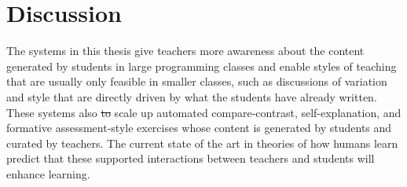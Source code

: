 \documentclass[12pt,twoside]{mitthesis}
\providecommand{\DIFdeltex}[1]{{\protect\color{red}\sout{#1}}}                      %
\providecommand{\DIFdelbegin}{} %
\providecommand{\DIFdelend}{} %
\providecommand{\DIFdel}[1]{\texorpdfstring{\DIFdeltex{#1}}{}} %
\begin{document}

%
\pagestyle{plain}
%

\pagestyle{fancyplain}
\addtolength{\headheight}{\baselineskip}

%
%
%
%
%
%
\chapter{Discussion}\label{chapter:discussion}

The systems in this thesis give teachers more awareness about the content generated by students in large programming classes and enable styles of teaching that are usually only feasible in smaller classes, such as discussions of variation and style that are directly driven by what the students have already written. These systems also \DIFdelbegin \DIFdel{to }\DIFdelend scale up automated compare-contrast, self-explanation, and formative assessment-style exercises whose content is generated by students and curated by teachers. The current state of the art in theories of how humans learn predict that these supported interactions between teachers and students will enhance learning.

\DIFdelbegin %

\end{document}

